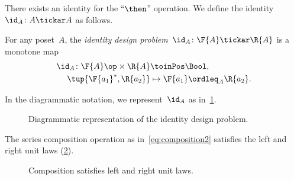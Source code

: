 There exists an identity for the ``$\then$'' operation.
We define the identity~$\id_A\colon A \tickar A$ as follows.

\begin{definition}
\label{def:dp-identity}
For any poset~$A$, the \emph{identity design problem}~$\id_A\colon \F{A} \tickar \R{A}$ is a monotone map
\begin{equation}
\begin{aligned}
  \id_A \colon \F{A}\op \times \R{A} & \toinPos   \Bool, \label{eq:identity}\\
  \tup{\F{a_1}^*, \R{a_2}} & \mapsto \F{a_1} \ordleq_{A} \R{a_2}.
\end{aligned}
\end{equation}
\end{definition}
In the diagrammatic notation, we represent~$\id_A$ as in~\cref{fig:identitydp}.

\begin{figure}[h!]
    \begin{center}
\end{center}
\caption{Diagrammatic representation of the identity design problem. \label{fig:identitydp}}
\end{figure}

\begin{lemma}
    The series composition operation as in~\cref{eq:composition2} satisfies the left and right unit laws (\cref{fig:compositionunital}).
\begin{figure}[h!]
\begin{center}
\end{center}
\caption{Composition satisfies left and right unit laws. \label{fig:compositionunital}}
\end{figure}
\end{lemma}

